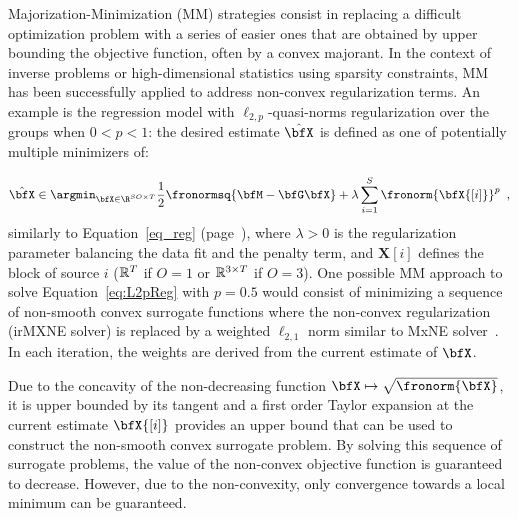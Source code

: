 Majorization-Minimization (MM) strategies consist in replacing a difficult optimization problem with a series of easier ones that are obtained by upper bounding the objective function, often by a convex majorant.
%
In the context of inverse problems or high-dimensional statistics using sparsity constraints, MM has been successfully applied to address non-convex regularization terms. An example is the regression model with $\ell_{2,p}$-quasi-norms regularization over the groups when $0<p<1$: the desired estimate $\hat{\bfX}$ is defined as one of potentially multiple minimizers of:

\begin{equation} \label{eq:L2pReg}
\hat{\bfX} \in \argmin_{\bfX\in\R^{SO \times T}} \frac{1}{2} \fronormsq{\bfM - \bfG \bfX}  + \lambda \sum_{i=1}^S \fronorm{\bfX{[i]}}^p \enspace,
\end{equation}
similarly to Equation~\eqref{eq_reg} (page~\pageref{eq_reg}), where $\lambda > 0$ is the regularization parameter balancing the data fit and the penalty term, and $\mathbf{X}[i]$ defines the block of source $i$ ($\mathbb{R}^T$ if $O=1$ or $\mathbb{R}^{3\times T}$ if $O=3$). One possible MM approach to solve Equation~\eqref{eq:L2pReg} with $p=0.5$ would consist of minimizing a sequence of non-smooth convex surrogate functions where the non-convex regularization (irMXNE solver) is replaced by a weighted $\ell_{2,1}$ norm similar to MxNE solver~\cite{strohmeier-etal:16}. In each iteration, the weights are derived from the current estimate of $\bfX$.

Due to the concavity of the non-decreasing function $\bfX\mapsto\sqrt{\fronorm{\bfX}}$, it is upper bounded by its tangent and a first order Taylor expansion at the current estimate $\bfX{[i]}$ provides an upper bound that can be used to construct the non-smooth convex surrogate problem. By solving this sequence of surrogate problems, the value of the non-convex objective function is guaranteed to decrease. However, due to the non-convexity, only convergence towards a local minimum can be guaranteed.

